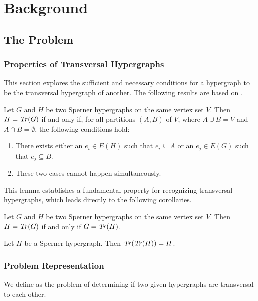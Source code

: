 \chapter{Background}

\section{The \TransHyp{} Problem}

\subsection{Properties of Transversal Hypergraphs}

This section explores the sufficient and necessary conditions for a hypergraph to be the transversal hypergraph of another. The following results are based on \cite{Ber87}.

\begin{lemma}\label{lem:partition}
Let $G$ and $H$ be two Sperner hypergraphs on the same vertex set $V$. Then $H=\mathit{Tr}(G)$ if and only if, for all partitions $(A,B)$ of $V$, where $A\cup B=V$ and $A\cap B=\emptyset$, the following conditions hold:
\begin{enumerate}
\item There exists either an $e_i\in E(H)$ such that $e_i\subseteq A$ or an $e_j\in E(G)$ such that $e_j\subseteq B$.
\item These two cases cannot happen simultaneously.
\end{enumerate}
\end{lemma}

This lemma establishes a fundamental property for recognizing transversal hypergraphs, which leads directly to the following corollaries.

\begin{corollary}
Let $G$ and $H$ be two Sperner hypergraphs on the same vertex set $V$. Then $H=\mathit{Tr}(G)$ if and only if $G=\mathit{Tr}(H)$.
\end{corollary}

\begin{corollary}
Let $H$ be a Sperner hypergraph. Then $\mathit{Tr}(\mathit{Tr}(H))=H$.
\end{corollary}

\subsection{Problem Representation}

We define \TransHyp{} as the problem of determining if two given hypergraphs are transversal to each other.

